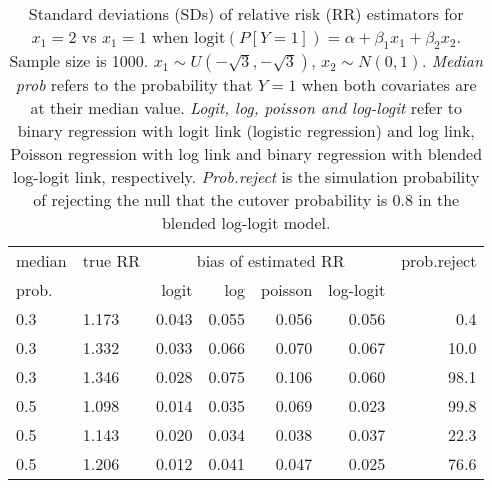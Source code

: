 \documentclass[12pt,a4paper]{article}
\begin{document}
\begin{table}[H] 
\small\sf\centering 
\caption{Standard deviations (SDs) of relative risk (RR) estimators for $x_1=2$ vs $x_1=1$ when $\mbox{logit}(P[Y=1])=\alpha+\beta_1 x_1 + \beta_2 x_2$. Sample size is 1000. $x_1 \sim $$U(-\sqrt{3},-\sqrt{3})$, $x_2 \sim N(0,1)$. {\it Median prob} refers to the probability that $Y=1$ when both covariates are at their median value. {\it Logit, log, poisson and log-logit} refer to binary regression with logit link (logistic regression) and log link, Poisson regression with log link and binary regression with blended log-logit link, respectively. {\it Prob.reject} is the simulation probability of rejecting the null that the cutover probability is $0.8$ in the blended log-logit model.} 
\begin{tabular}{llrrrrr} 
\toprule 
median & true RR & \multicolumn{4}{c}{bias of estimated RR} & prob.reject \\ 
prob. & & logit & log & poisson & log-logit  & \\ \midrule 
0.3 & 1.173 & 0.043 & 0.055 & 0.056 & 0.056 &  0.4 \\  
0.3 & 1.332 & 0.033 & 0.066 & 0.070 & 0.067 & 10.0 \\  
0.3 & 1.346 & 0.028 & 0.075 & 0.106 & 0.060 & 98.1 \\  
0.5 & 1.098 & 0.014 & 0.035 & 0.069 & 0.023 & 99.8 \\  
0.5 & 1.143 & 0.020 & 0.034 & 0.038 & 0.037 & 22.3 \\  
0.5 & 1.206 & 0.012 & 0.041 & 0.047 & 0.025 & 76.6 \\  
\bottomrule 
\end{tabular} 
\end{table} 
\end{document}
